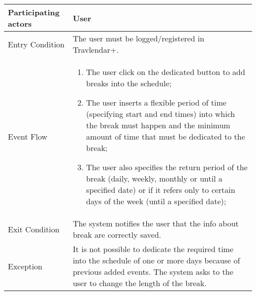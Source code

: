 \begin{table}[H]
	\begin{center}
		\begin{tabular}{ | p{} | p{} | }
		\hline
		Participating actors & User\\
		\hline
		Entry Condition & The user must be logged/registered in Travlendar+.\\
		\hline
		Event Flow & 
			\begin{enumerate}
				\item The user click on the dedicated button to add breaks into the schedule;
				\item The user inserts a flexible period of time (specifying start and end times) into which the break must happen and the minimum amount of time that must be dedicated to the break;
				\item The user also specifies the return period of the break (daily, weekly, monthly or until a specified date) or if it refers only to certain days of the week (until a specified date);
			\end{enumerate} \\
		\hline
		Exit Condition &  The system notifies the user that the info about break are correctly saved.\\
		\hline
		Exception & It is not possible to dedicate the required time into the schedule of one or more days because of previous added events. The system asks to the user to change the length of the break.
\\ 
		\hline
		\end{tabular}
	\end{center}
\end{table}